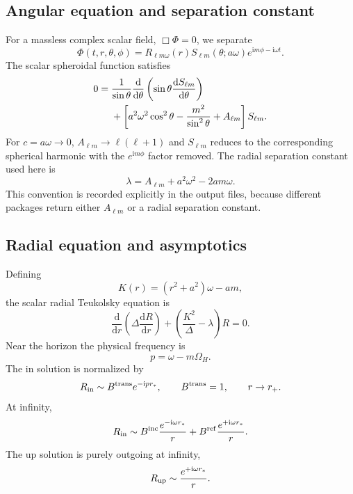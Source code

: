 \documentclass[aps,prd,twocolumn,nofootinbib,superscriptaddress,10pt]{revtex4-2}
\newcommand{\ii}{\mathrm{i}}
\newcommand{\dd}{\mathrm{d}}
\newcommand{\rp}{r_+}
\newcommand{\OmH}{\Omega_H}
\newcommand{\Bin}{B^{\rm inc}}
\newcommand{\Bref}{B^{\rm ref}}
\newcommand{\Btrans}{B^{\rm trans}}
\begin{document}
\subsection{Angular equation and separation constant}

For a massless complex scalar field, $\Box\Phi=0$, we separate
\begin{equation}
\Phi(t,r,\theta,\phi)=
R_{\ell m\omega}(r)S_{\ell m}(\theta;a\omega)
e^{\ii m\phi-\ii\omega t}.
\end{equation}
The scalar spheroidal function satisfies
\begin{align}
0={}&
\frac{1}{\sin\theta}\frac{\dd}{\dd\theta}
\left(\sin\theta\frac{\dd S_{\ell m}}{\dd\theta}\right)
\notag\\
&+
\left[
a^2\omega^2\cos^2\theta
-\frac{m^2}{\sin^2\theta}
 + A_{\ell m}
\right]S_{\ell m}.
\end{align}
For $c=a\omega\rightarrow0$, $A_{\ell m}\rightarrow \ell(\ell+1)$ and
$S_{\ell m}$ reduces to the corresponding spherical harmonic with the
$e^{\ii m\phi}$ factor removed.  The radial separation constant used here is
\begin{equation}
\lambda=A_{\ell m}+a^2\omega^2-2am\omega.
\label{eq:lambda}
\end{equation}
This convention is recorded explicitly in the output files, because different
packages return either $A_{\ell m}$ or a radial separation constant.

\subsection{Radial equation and asymptotics}

Defining
\begin{equation}
K(r)=(r^2+a^2)\omega-am,
\end{equation}
the scalar radial Teukolsky equation is
\begin{equation}
\frac{\dd}{\dd r}\left(\Delta\frac{\dd R}{\dd r}\right)
+\left(\frac{K^2}{\Delta}-\lambda\right)R=0 .
\label{eq:radial}
\end{equation}
Near the horizon the physical frequency is
\begin{equation}
p=\omega-m\OmH .
\end{equation}
The in solution is normalized by
\begin{equation}
R_{\rm in}\sim \Btrans e^{-\ii p r_*},\qquad \Btrans=1,
\qquad r\rightarrow \rp .
\label{eq:horizon_norm}
\end{equation}
At infinity,
\begin{equation}
R_{\rm in}\sim
\Bin \frac{e^{-\ii\omega r_*}}{r}
+\Bref \frac{e^{+\ii\omega r_*}}{r}.
\label{eq:infinity_amp}
\end{equation}
The up solution is purely outgoing at infinity,
\begin{equation}
R_{\rm up}\sim \frac{e^{+\ii\omega r_*}}{r}.
\end{equation}
\end{document}
